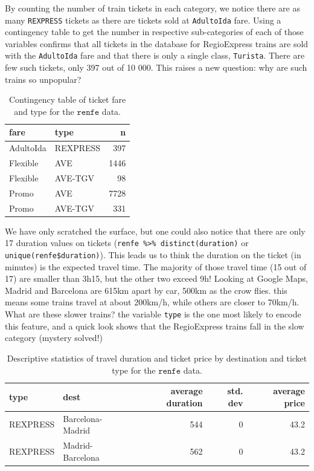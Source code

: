 \documentclass[
  11pt,
  letterpaper,
]{book}
\theoremstyle{definition}
\theoremstyle{definition}
\theoremstyle{definition}
\theoremstyle{definition}
\theoremstyle{remark}
\begin{document}
By counting the number of train tickets in each category, we notice there are as many \texttt{REXPRESS} tickets as there are tickets sold at \texttt{AdultoIda} fare. Using a contingency table to get the number in respective sub-categories of each of those variables confirms that all tickets in the database for RegioExpress trains are sold with the \texttt{AdultoIda} fare and that there is only a single class, \texttt{Turista}. There are few such tickets, only 397 out of 10 000. This raises a new question: why are such trains so unpopular?

\begin{table}

\caption{\label{tab:renfe-aed2}Contingency table of ticket fare and type for the $\texttt{renfe}$ data.}
\centering
\begin{tabular}[t]{llr}
\toprule
fare & type & n\\
\midrule
AdultoIda & REXPRESS & 397\\
Flexible & AVE & 1446\\
Flexible & AVE-TGV & 98\\
Promo & AVE & 7728\\
Promo & AVE-TGV & 331\\
\bottomrule
\end{tabular}
\end{table}

We have only scratched the surface, but one could also notice that there are only 17 duration values on tickets (\texttt{renfe\ \%\textgreater{}\%\ distinct(duration)} or \texttt{unique(renfe\$duration)}). This leads us to think the duration on the ticket (in minutes) is the expected travel time. The majority of those travel time (15 out of 17) are smaller than 3h15, but the other two exceed 9h! Looking at Google Maps, Madrid and Barcelona are 615km apart by car, 500km as the crow flies. this means some trains travel at about 200km/h, while others are closer to 70km/h. What are these slower trains? the variable \texttt{type} is the one most likely to encode this feature, and a quick look shows that the RegioExpress trains fall in the slow category (mystery solved!)

\begin{table}

\caption{\label{tab:renfe-aed3}Descriptive statistics of travel duration and ticket price by destination and ticket type for the $\texttt{renfe}$ data.}
\centering
\begin{tabular}[t]{llrrr}
\toprule
type & dest & average duration & std. dev & average price\\
\midrule
REXPRESS & Barcelona-Madrid & 544 & 0 & 43.2\\
REXPRESS & Madrid-Barcelona & 562 & 0 & 43.2\\
\bottomrule
\end{tabular}
\end{table}
\end{document}
